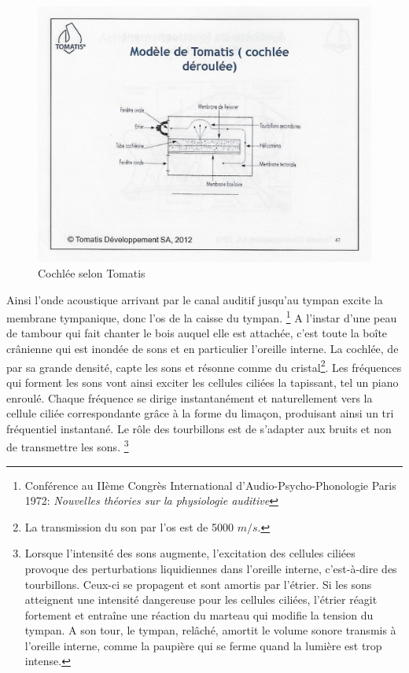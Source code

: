  \begin{figure}
	\centering
	\includegraphics[width=0.7\linewidth]{images/Cochleederoule_haut.jpg}
	\caption[Cochlée selon Tomatis]{Cochlée selon Tomatis}
	\label{fig:cochleederoulehaut}
      \end{figure}

      
Ainsi
l'onde acoustique arrivant par le canal auditif
jusqu'au tympan  excite la membrane tympanique, donc l'os de la caisse du tympan. \footnote{Conférence au IIème Congrès International d'Audio-Psycho-Phonologie
Paris 1972:  \emph{Nouvelles théories sur la physiologie auditive}}
A l'instar d'une
peau de tambour qui fait chanter le bois auquel elle est attachée,
c'est toute la boîte crânienne qui est inondée de sons et en particulier
l'oreille interne. La cochlée, de par sa grande densité, capte les sons
et résonne comme du cristal\footnote{La transmission du son par l'os est de 
5000 $m/s$.}.
Les fréquences qui forment les sons vont ainsi exciter les cellules
ciliées la tapissant, tel un piano enroulé.
Chaque fréquence se dirige instantanément et
naturellement vers la cellule ciliée correspondante grâce à la
forme du limaçon, produisant ainsi un tri fréquentiel 
instantané.
Le rôle des tourbillons est de s'adapter aux bruits
et non de transmettre les sons.
\footnote{Lorsque l'intensité des sons aug\-men\-te,
l'ex\-ci\-ta\-tion des cellules ciliées provoque des perturbations liquidiennes
dans l'oreille interne, c'est-à-dire des tourbillons. Ceux-ci se propagent
et sont amortis par l'étrier. Si les sons atteignent une intensité
dangereuse pour les cellules ciliées, l'étrier réagit fortement et
entraîne une réaction du marteau qui modifie la tension du tympan.
A son tour, le tympan, relâché, amortit le volume sonore transmis
à l'oreille interne, comme la paupière qui se ferme quand la lumière
est trop intense.}


